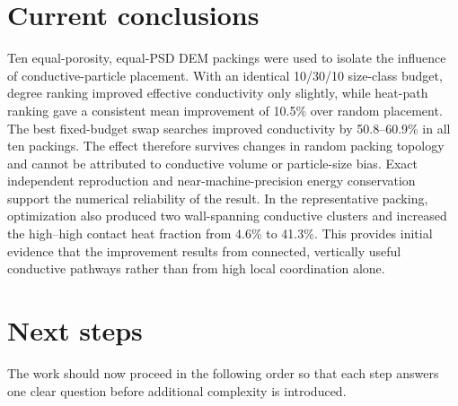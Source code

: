 \documentclass[12pt,a4paper]{article}
\begin{document}
	\section{Current conclusions}
	
	Ten equal-porosity, equal-PSD DEM packings were used to isolate the influence
	of conductive-particle placement. With an identical 10/30/10 size-class budget,
	degree ranking improved effective conductivity only slightly, while heat-path
	ranking gave a consistent mean improvement of 10.5\% over random placement.
	The best fixed-budget swap searches improved conductivity by 50.8--60.9\% in
	all ten packings. The effect therefore survives changes in random packing
	topology and cannot be attributed to conductive volume or particle-size bias.
	Exact independent reproduction and near-machine-precision energy conservation
	support the numerical reliability of the result. In the representative packing,
	optimization also produced two wall-spanning conductive clusters and increased
	the high--high contact heat fraction from 4.6\% to 41.3\%. This provides initial
	evidence that the improvement results from connected, vertically useful
	conductive pathways rather than from high local coordination alone.
	
	\section{Next steps}
	
	The work should now proceed in the following order so that each step answers
	one clear question before additional complexity is introduced.
	
\end{document}
